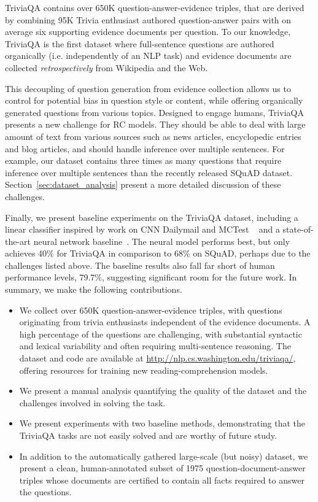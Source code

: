 TriviaQA contains over 650K question-answer-evidence triples, that are derived by combining 95K Trivia enthusiast authored question-answer pairs with on average six supporting evidence documents per question. To our knowledge, TriviaQA is the first dataset where full-sentence questions are authored organically (i.e. independently of an NLP task) and evidence documents are collected \emph{retrospectively} from Wikipedia and the Web. 

This decoupling of question generation from evidence collection allows us to control for potential bias in question style or content, while offering organically generated questions from various topics. Designed to engage humans, TriviaQA presents a new challenge for RC models. They should be able to deal with large amount of text from various sources such as news articles, encyclopedic entries and blog articles, and should handle inference over multiple sentences. For example, our dataset contains three times as many questions that require inference over multiple sentences than the recently released SQuAD \cite{Rajpurkar:16} dataset. 
Section~\ref{sec:dataset_analysis} present a more detailed discussion of these challenges. 

Finally, we present baseline experiments on the TriviaQA dataset, including a linear classifier inspired by work on CNN Dailymail and MCTest ~\cite{chen2016thorough, Richardson:13} and a state-of-the-art neural network baseline~\cite{SeoKFH16}. The neural model performs best, but only achieves 40\%  for TriviaQA in comparison to 68\% on SQuAD, perhaps due to the challenges listed above. The baseline results also fall far short of human performance levels, 79.7\%, suggesting significant room for the future work. In summary, we make the following contributions.

\begin{itemize}
\item We collect over 650K question-answer-evidence triples, with questions originating from trivia enthusiasts independent of the evidence documents. A high percentage of the questions are challenging, with substantial syntactic and lexical variability and often requiring multi-sentence reasoning. The dataset and code are available at \url{http://nlp.cs.washington.edu/triviaqa/}, offering resources for training new reading-comprehension models. 

\item We present a manual analysis quantifying the quality of the dataset and the challenges involved in solving the task.

\item We present experiments with two baseline methods, demonstrating that the TriviaQA tasks are not easily solved and are worthy of future study.

\item In addition to the automatically gathered large-scale (but noisy) dataset, we present a clean, human-annotated subset of 1975 question-document-answer triples whose documents are certified to contain all facts required to answer the questions.

\end{itemize}

